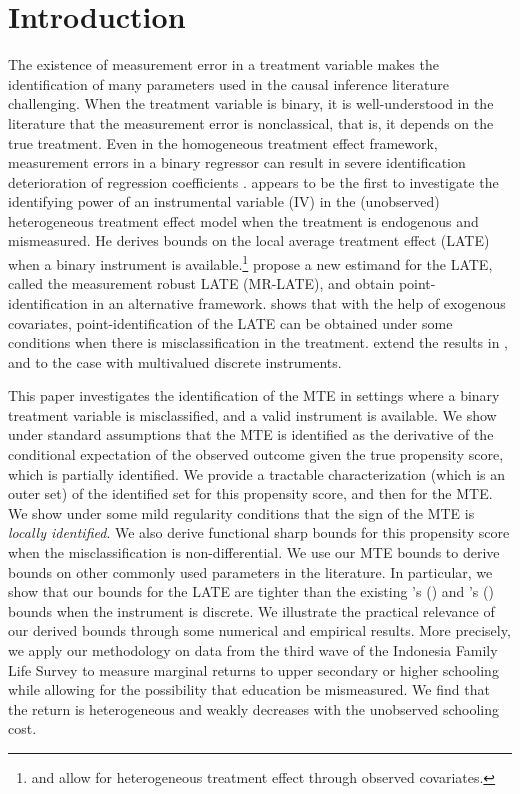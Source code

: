\documentclass[11pt,reqno]{amsart}
\theoremstyle{plain}
\numberwithin{equation}{section}
\begin{document}
\section{Introduction}
The existence of measurement error in a treatment variable makes the identification of many parameters used in the causal inference literature challenging. When the treatment variable is binary, it is well-understood in the literature that the measurement error is nonclassical, that is, it depends on the true treatment. Even in the homogeneous treatment effect framework, measurement errors in a binary regressor can result in severe identification deterioration of regression coefficients \citep{Kreider2010}. \cite{Ura2018} appears to be the first to investigate the identifying power of an instrumental variable (IV) in the (unobserved) heterogeneous treatment effect model when the treatment is endogenous and mismeasured. He derives bounds on the local average treatment effect (LATE) when a binary instrument is available.\footnote{\cite{Mahajan2006} and \cite{Lewbel2007} allow for heterogeneous treatment effect through observed covariates.} \cite{Calvi_al2018} propose a new estimand for the LATE, called the measurement robust LATE (MR-LATE), and obtain point-identification in an alternative framework. \cite{Yanagi2019} shows that with the help of exogenous covariates, point-identification of the LATE can be obtained under some conditions when there is misclassification in the treatment. \cite{Tommasi2020} extend the results in \cite{Ura2018}, and \cite{Calvi_al2018} to the case with multivalued discrete instruments.

This paper investigates the identification of the MTE in settings where a binary treatment variable is misclassified, and a valid instrument is available. We show under standard assumptions that the MTE is identified as the derivative of the conditional expectation of the observed outcome given the true propensity score, which is partially identified. We provide a tractable characterization (which is an outer set) of the identified set for this propensity score, and then for the MTE. We show under some mild regularity conditions that the sign of the MTE is \textit{locally identified}. We also derive functional sharp bounds for this propensity score when the misclassification is non-differential. We use our MTE bounds to derive bounds on other commonly used parameters in the literature. In particular, we show that  our bounds for the LATE are tighter than the existing \citeauthor{Ura2018}'s (\citeyear{Ura2018}) and \citeauthor{Tommasi2020}'s (\citeyear{Tommasi2020}) bounds when the instrument is discrete. We illustrate the practical relevance of our derived bounds through some numerical and empirical results. More precisely, we apply our methodology on data from the third wave of the Indonesia Family Life Survey to measure marginal returns to upper secondary or higher schooling while allowing for the possibility that education be mismeasured. We find that the return is heterogeneous and weakly decreases with the unobserved schooling cost. 
\end{document}
